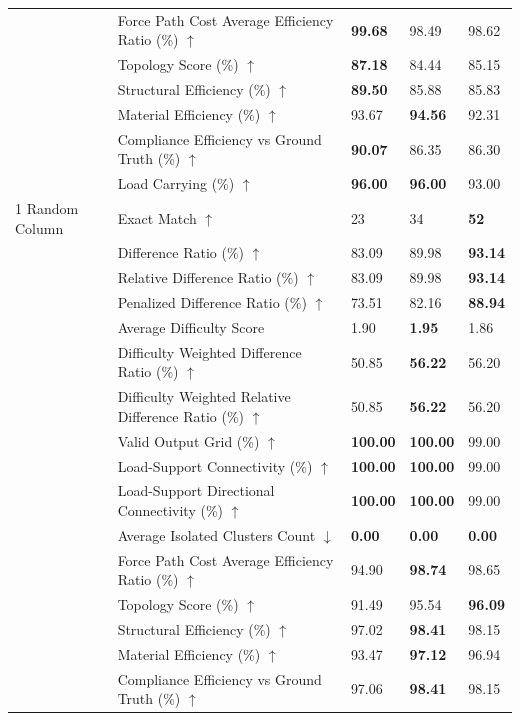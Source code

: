\begin{table}[!h]
{\begin{tabular}{lllll}
 & Force Path Cost Average Efficiency Ratio (\%) $\uparrow$ & \textbf{99.68} & 98.49 & 98.62 \\
 & Topology Score (\%) $\uparrow$ & \textbf{87.18} & 84.44 & 85.15 \\
 & Structural Efficiency (\%) $\uparrow$ & \textbf{89.50} & 85.88 & 85.83 \\
 & Material Efficiency (\%) $\uparrow$ & 93.67 & \textbf{94.56} & 92.31 \\
 & Compliance Efficiency vs Ground Truth (\%) $\uparrow$ & \textbf{90.07} & 86.35 & 86.30 \\
 & Load Carrying (\%) $\uparrow$ & \textbf{96.00} & \textbf{96.00} & 93.00 \\
1 Random Column & Exact Match $\uparrow$ & 23 & 34 & \textbf{52} \\
 & Difference Ratio (\%) $\uparrow$ & 83.09 & 89.98 & \textbf{93.14} \\
 & Relative Difference Ratio (\%) $\uparrow$ & 83.09 & 89.98 & \textbf{93.14} \\
 & Penalized Difference Ratio (\%) $\uparrow$ & 73.51 & 82.16 & \textbf{88.94} \\
 & Average Difficulty Score & 1.90 & \textbf{1.95} & 1.86 \\
 & Difficulty Weighted Difference Ratio (\%) $\uparrow$ & 50.85 & \textbf{56.22} & 56.20 \\
 & Difficulty Weighted Relative Difference Ratio (\%) $\uparrow$ & 50.85 & \textbf{56.22} & 56.20 \\
 & Valid Output Grid (\%) $\uparrow$ & \textbf{100.00} & \textbf{100.00} & 99.00 \\
 & Load-Support Connectivity (\%) $\uparrow$ & \textbf{100.00} & \textbf{100.00} & 99.00 \\
 & Load-Support Directional Connectivity (\%) $\uparrow$ & \textbf{100.00} & \textbf{100.00} & 99.00 \\
 & Average Isolated Clusters Count $\downarrow$ & \textbf{0.00} & \textbf{0.00} & \textbf{0.00} \\
 & Force Path Cost Average Efficiency Ratio (\%) $\uparrow$ & 94.90 & \textbf{98.74} & 98.65 \\
 & Topology Score (\%) $\uparrow$ & 91.49 & 95.54 & \textbf{96.09} \\
 & Structural Efficiency (\%) $\uparrow$ & 97.02 & \textbf{98.41} & 98.15 \\
 & Material Efficiency (\%) $\uparrow$ & 93.47 & \textbf{97.12} & 96.94 \\
 & Compliance Efficiency vs Ground Truth (\%) $\uparrow$ & 97.06 & \textbf{98.41} & 98.15 \\

\end{tabular}}
\end{table}
